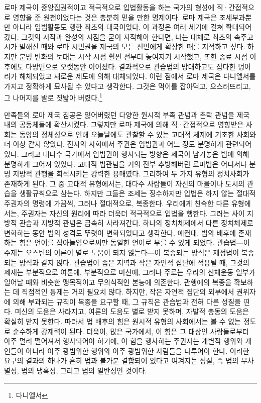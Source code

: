 로마 제국이 중앙집권적이고 적극적으로 입법활동을 하는 국가의 형성에
직·간접적으로 영향을 준 원천이었다는 것은 충분히 믿을 만한 명제이다.
로마 제국은 조세부과뿐만 아니라 입법활동도 행한 최초의 대국이었다.
이 과정은 여러 세기에 걸쳐 확대되어갔다.
그것의 시작과 완성의 시점을 굳이 지적해야 한다면,
나는 대체로
최초의 속주고시가 발해진 때와
로마 시민권을 제국의 모든 신민에게 확장한 때를 지적하고 싶다.
하지만 분명 변화의 토대는 시작 시점 훨씬 전부터 놓여지기 시작했고,
또한 종료 시점 이후에도 다방면으로 오랫동안 이어졌다.
결과적으로
관습법의 방대하고도 잡다한 덩어리가 해체되었고
새로운 제도에 의해 대체되었다.
이런 점에서 로마 제국은 다니엘서를 가지고 정확하게 묘사될 수 있다고 생각한다.
그것은
먹이를 잡아먹고, 으스러뜨리고, 그 나머지를 발로 짓밟아 버렸다.\footnote{%
  다니엘서  }

만족들의 로마 제국 침공은
잃어버렸던 다양한 원시적 부족 관념과 촌락 관념을
제국 내의 공동체들에 확산시켰다.
그렇지만
로마 제국에 의해 직·간접적으로 영향받은 사회는
동양의 정체성으로 인해 오늘날에도 관찰할 수 있는
고대적 체제에 기초한 사회와 더 이상 같지 않았다.
전자의 사회에서 주권은 입법권과 어느 정도 분명하게 관련되어 있다.
그리고
대다수 국가에서 입법권이 행사되는 방향은 제국이 남겨놓은
법에 의해 분명하게 그어져 있었다.
고대적 법관념을 거의 전부 추방해버린 로마법은
어디서나 분명 지방적 관행을 희석시키는 강력한 용매였다.
그리하여 두 가지 유형의 정치사회가 존재하게 된다.
그 중 고대적 유형에서는,
대다수 사람들이 자신의 마을이나 도시의 관습을 생활규칙으로 삼는다.
하지만 그들은 조세는 징수하지만 입법은 하지 않는 절대적 주권자의 명령에
가끔씩, 그러나 절대적으로, 복종한다.
우리에게 친숙한 다른 유형에서는,
주권자는 자신의 원리에 따라 더욱더 적극적으로 입법을 행한다.
그러는 사이 지방적 관습과 지방적 관념은 급속히 사라져간다.
하나의 정치체제에서 다른 정치체제로 변화하는 동안
법의 성격도 뚜렷이 변화되었다고 생각한다.
예컨대, 법의 배후에 존재하는 힘은
언어를 잡아늘임으로써만 동일한 언어로 부를 수 있게 되었다.
관습법---이 주제는 오스틴의 이론이 별로 도움이 되지 않는다---이 복종되는
방식은 제정법이 복종되는 방식과 같지 않다.
관습법이 좁은 지역과 작은 자연적 집단에 적용될 때,
그것의 제재는 부분적으로 여론에, 부분적으로 미신에,
그러나 주로는 우리의 신체운동 일부가 일어날 때와 비슷한 맹목적이고
무의식적인 본능에 의존한다.
관행에의 복종을 확보하는 데 직접적인 통제는 거의 필요치 않다.
하지만, 작은 자연적 집단의 외부에서 권위자에 의해 부과되는 규칙이
복종을 요구할 때, 그 규칙은 관습법과 전혀 다른 성질을 띤다.
미신의 도움은 사라지고, 여론의 도움도 별로 받지 못하며,
자발적 충동의 도움은 확실히 받지 못한다.
따라서 법 배후의 힘은 원시적 유형의 사회에서는 볼 수 없는 정도로
순수하게 강제력이 된다.
더욱이, 많은 국가에서,
이 힘은 그 대상인 사람들로부터 아주 멀리 떨어져서 행사되어야 하기에,
이 힘을 행사하는 주권자는
개별적 행위와 개인들이 아니라
아주 광범위한 행위와 아주 광범위한 사람들을 다루어야 한다.
이러한 요구의 결과의 하나가
흔히 법과 불가분 결합되어 있다고 여겨지는 성질,
즉 법의 무차별성, 법의 냉혹성, 그리고 법의 일반성인 것이다.

